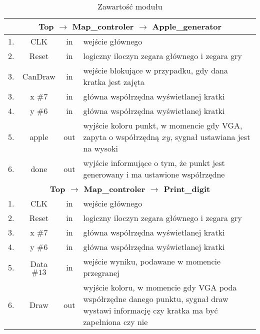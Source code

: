         \newpage
    \begin{table}[!ht]
        \begin{tabularx}{\textwidth}{|l|c|c|X|}\hline
            \multicolumn{4}{|c|}{\textbf{Top $\rightarrow$ Map\_controler $\rightarrow$ Apple\_generator}}\\\hline
            1. & CLK         & in  & wejście głównego \\\hline
            2. & Reset       & in  & logiczny iloczyn zegara głównego i zegara gry\\\hline
            3. & CanDraw     & in  & wejście blokujące w przypadku, gdy dana kratka jest zajęta\\\hline
            3. & x $\#7$     & in  & główna współrzędna wyświetlanej kratki\\\hline
            4. & y $\#6$     & in  & główna współrzędna wyświetlanej kratki\\\hline
            5. & apple       & out & wyjście koloru punkt, w momencie gdy VGA, zapyta o współrzędną $xy$, sygnał ustawiana jest na wysoki\\\hline
            6. & done        & out & wyjście informujące o tym, że punkt jest generowany i ma ustawione współrzędne\\\hline
            \hline
            \multicolumn{4}{|c|}{\textbf{Top $\rightarrow$ Map\_controler $\rightarrow$ Print\_digit}}\\\hline
            1. & CLK         & in  & wejście głównego \\\hline
            2. & Reset       & in  & logiczny iloczyn zegara głównego i zegara gry\\\hline
            3. & x $\#7$     & in  & główna współrzędna wyświetlanej kratki\\\hline
            4. & y $\#6$     & in  & główna współrzędna wyświetlanej kratki\\\hline
            5. & Data $\#13$ & in  & wejście wyniku, podawane w momencie przegranej\\\hline
            6. & Draw        & out & wyjście koloru, w momencie gdy VGA poda współrzędne danego punktu, sygnał draw wystawi informację czy kratka ma być zapełniona czy nie\\\hline
        \end{tabularx}
        \caption{Zawartość modułu}
    \end{table}